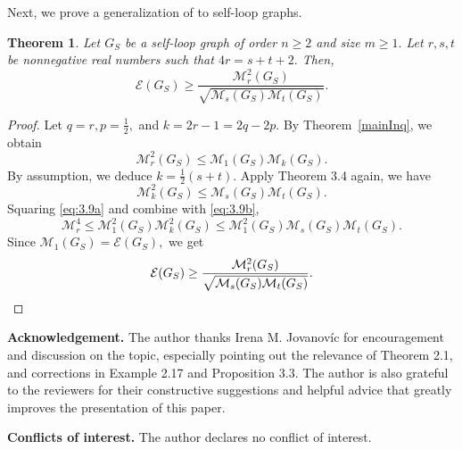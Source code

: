 \documentclass[12pt,a4paper,reqno]{amsart}
\numberwithin{equation}{section}
\theoremstyle{plain}
\newtheorem{theorem}{Theorem}[section]
\theoremstyle{definition}
\newcommand{\<}{\langle}
\renewcommand{\>}{\rangle}
\newcommand{\cE}{{\mathcal E}}
\newcommand{\cM}{{\mathcal M}}
\begin{document}
Next, we prove a generalization of \cite[Theorem 1a]{Zhou2007} to self-loop graphs. 

\begin{theorem}
Let $G_S$ be a self-loop graph of order $n \geq 2$ and size $m\geq 1.$ Let $r,s,t$ be nonnegative real numbers such that $4r=s+t+2.$ Then,
\[
\cE(G_S) \geq \frac{\cM^2_r(G_S)}{\sqrt{\cM_s(G_S) \cM_t(G_S)}}.
\]
\end{theorem}

\begin{proof}
Let $q=r, p=\frac{1}{2},$ and $k=2r-1 = 2q-2p.$ By Theorem~\ref{mainInq}, we obtain 
\begin{equation} \label{eq:3.9a}
\cM_r^2(G_S) \leq \cM_1(G_S) \cM_{k}(G_S).
\end{equation}
By assumption, we deduce $k=\frac{1}{2}(s+t).$ Apply Theorem 3.4 again, we have 
\begin{equation}\label{eq:3.9b}
\cM^2_{k}(G_S) \leq \cM_s(G_S)\cM_t(G_S).
\end{equation} 
Squaring \eqref{eq:3.9a} and combine with \eqref{eq:3.9b},
\[
\cM_r^{4} \leq \cM_1^2(G_S) \cM_k^2(G_S) \leq \cM_1^2(G_S)\cM_s(G_S)\cM_t(G_S). 
\] Since $\cM_1(G_S)=\cE(G_S),$ we get 
\[
\cE(G_S) \geq \frac{\cM^2_r(G_S)}{\sqrt{\cM_s(G_S) \cM_t(G_S)}}.\qedhere
\]
\end{proof}


\vspace{0.5cm}
\textbf{Acknowledgement.}
The author thanks Irena M. Jovanov\'ic for encouragement and discussion on the topic, especially pointing out the relevance of Theorem 2.1, and corrections in Example 2.17 and Proposition 3.3. The author is also grateful to the reviewers for their constructive suggestions and helpful advice that greatly improves the presentation of this paper.

\vspace{0.5cm}
\textbf{Conflicts of interest.} The author declares no conflict of interest.

{}


\end{document}
